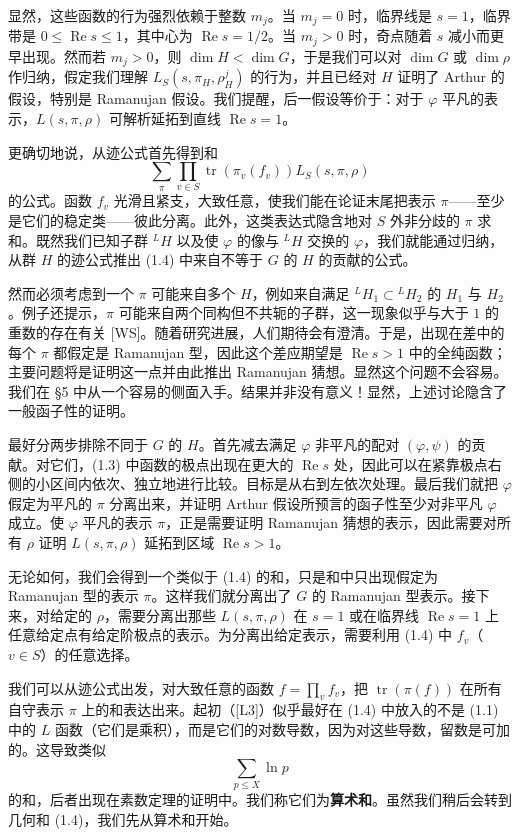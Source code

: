 显然，这些函数的行为强烈依赖于整数 $m_j$。当 $m_j=0$ 时，临界线是 $s=1$，临界带是 $0\le\operatorname{Re}s\le1$，其中心为 $\operatorname{Re}s=1/2$。当 $m_j>0$ 时，奇点随着 $s$ 减小而更早出现。然而若 $m_j>0$，则 $\dim H<\dim G$，于是我们可以对 $\dim G$ 或 $\dim\rho$ 作归纳，假定我们理解 $L_S(s,\pi_H,\rho^j_H)$ 的行为，并且已经对 $H$ 证明了 Arthur 的假设，特别是 Ramanujan 假设。我们提醒，后一假设等价于：对于 $\varphi$ 平凡的表示，$L(s,\pi,\rho)$ 可解析延拓到直线 $\operatorname{Re}s=1$。

更确切地说，从迹公式首先得到和
\begin{equation}\tag{1.4}
\sum_\pi\prod_{v\in S}\operatorname{tr}(\pi_v(f_v))L_S(s,\pi,\rho)
\end{equation}
的公式。函数 $f_v$ 光滑且紧支，大致任意，使我们能在论证末尾把表示 $\pi$——至少是它们的稳定类——彼此分离。此外，这类表达式隐含地对 $S$ 外非分歧的 $\pi$ 求和。既然我们已知子群 ${}^LH$ 以及使 $\varphi$ 的像与 ${}^LH$ 交换的 $\varphi$，我们就能通过归纳，从群 $H$ 的迹公式推出 (1.4) 中来自不等于 $G$ 的 $H$ 的贡献的公式。

然而必须考虑到一个 $\pi$ 可能来自多个 $H$，例如来自满足 ${}^LH_1\subset{}^LH_2$ 的 $H_1$ 与 $H_2$。例子还提示，$\pi$ 可能来自两个同构但不共轭的子群，这一现象似乎与大于 $1$ 的重数的存在有关 [WS]。随着研究进展，人们期待会有澄清。于是，出现在差中的每个 $\pi$ 都假定是 Ramanujan 型，因此这个差应期望是 $\operatorname{Re}s>1$ 中的全纯函数；主要问题将是证明这一点并由此推出 Ramanujan 猜想。显然这个问题不会容易。我们在 §5 中从一个容易的侧面入手。结果并非没有意义！显然，上述讨论隐含了一般函子性的证明。

最好分两步排除不同于 $G$ 的 $H$。首先减去满足 $\varphi$ 非平凡的配对 $(\varphi,\psi)$ 的贡献。对它们，(1.3) 中函数的极点出现在更大的 $\operatorname{Re}s$ 处，因此可以在紧靠极点右侧的小区间内依次、独立地进行比较。目标是从右到左依次处理。最后我们就把 $\varphi$ 假定为平凡的 $\pi$ 分离出来，并证明 Arthur 假设所预言的函子性至少对非平凡 $\varphi$ 成立。使 $\varphi$ 平凡的表示 $\pi$，正是需要证明 Ramanujan 猜想的表示，因此需要对所有 $\rho$ 证明 $L(s,\pi,\rho)$ 延拓到区域 $\operatorname{Re}s>1$。

无论如何，我们会得到一个类似于 (1.4) 的和，只是和中只出现假定为 Ramanujan 型的表示 $\pi$。这样我们就分离出了 $G$ 的 Ramanujan 型表示。接下来，对给定的 $\rho$，需要分离出那些 $L(s,\pi,\rho)$ 在 $s=1$ 或在临界线 $\operatorname{Re}s=1$ 上任意给定点有给定阶极点的表示。为分离出给定表示，需要利用 (1.4) 中 $f_v$（$v\in S$）的任意选择。

我们可以从迹公式出发，对大致任意的函数 $f=\prod_v f_v$，把 $\operatorname{tr}(\pi(f))$ 在所有自守表示 $\pi$ 上的和表达出来。起初（[L3]）似乎最好在 (1.4) 中放入的不是 (1.1) 中的 $L$ 函数（它们是乘积），而是它们的对数导数，因为对这些导数，留数是可加的。这导致类似
\[
\sum_{p\le X}\ln p
\]
的和，后者出现在素数定理的证明中。我们称它们为\textbf{算术和}。虽然我们稍后会转到几何和 (1.4)，我们先从算术和开始。

